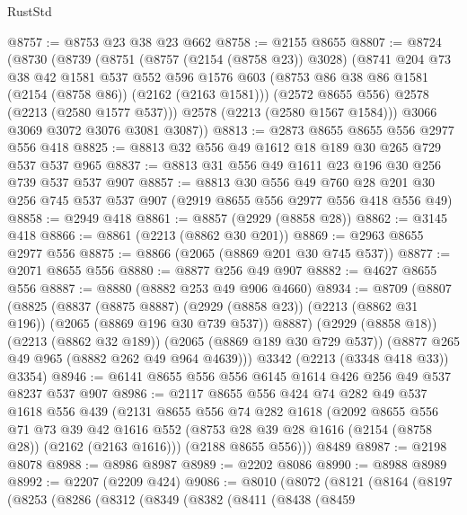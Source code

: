 \begin{lexlean}{RustStd}
\begin{coremodule}
@8757 := @8753 @23 @38 @23 @662
@8758 := @2155 @8655
@8807 := @8724
    (@8730
      (@8739
        (@8751
          (@8757 (@2154 (@8758 @23)) @3028)
          (@8741
            @204
            @73
            @38
            @42
            @1581
            @537
            @552
            @596
            @1576
            @603
            (@8753 @86 @38 @86 @1581 (@2154 (@8758 @86)) (@2162 (@2163 @1581)))
            (@2572 @8655 @556)
            @2578
            (@2213 (@2580 @1577 @537)))
          @2578
          (@2213 (@2580 @1567 @1584)))
        @3066
        @3069
        @3072
        @3076
        @3081
        @3087))
@8813 := @2873 @8655 @8655 @556 @2977 @556 @418
@8825 := @8813 @32 @556 @49 @1612 @18 @189 @30 @265 @729 @537 @537 @965
@8837 := @8813 @31 @556 @49 @1611 @23 @196 @30 @256 @739 @537 @537 @907
@8857 := @8813
    @30
    @556
    @49
    @760
    @28
    @201
    @30
    @256
    @745
    @537
    @537
    @907
    (@2919 @8655 @556 @2977 @556 @418 @556 @49)
@8858 := @2949 @418
@8861 := @8857 (@2929 (@8858 @28))
@8862 := @3145 @418
@8866 := @8861 (@2213 (@8862 @30 @201))
@8869 := @2963 @8655 @2977 @556
@8875 := @8866 (@2065 (@8869 @201 @30 @745 @537))
@8877 := @2071 @8655 @556
@8880 := @8877 @256 @49 @907
@8882 := @4627 @8655 @556
@8887 := @8880 (@8882 @253 @49 @906 @4660)
@8934 := @8709
    (@8807
      (@8825
        (@8837
          (@8875 @8887)
          (@2929 (@8858 @23))
          (@2213 (@8862 @31 @196))
          (@2065 (@8869 @196 @30 @739 @537))
          @8887)
        (@2929 (@8858 @18))
        (@2213 (@8862 @32 @189))
        (@2065 (@8869 @189 @30 @729 @537))
        (@8877 @265 @49 @965 (@8882 @262 @49 @964 @4639)))
      @3342
      (@2213 (@3348 @418 @33))
      @3354)
@8946 := @6141 @8655 @556 @556 @6145 @1614 @426 @256 @49 @537 @8237 @537 @907
@8986 := @2117
    @8655
    @556
    @424
    @74
    @282
    @49
    @537
    @1618
    @556
    @439
    (@2131
      @8655
      @556
      @74
      @282
      @1618
      (@2092
        @8655
        @556
        @71
        @73
        @39
        @42
        @1616
        @552
        (@8753 @28 @39 @28 @1616 (@2154 (@8758 @28)) (@2162 (@2163 @1616)))
        (@2188 @8655 @556)))
    @8489
@8987 := @2198 @8078
@8988 := @8986 @8987
@8989 := @2202 @8086
@8990 := @8988 @8989
@8992 := @2207 (@2209 @424)
@9086 := @8010
    (@8072
      (@8121
        (@8164
          (@8197
            (@8253
              (@8286
                (@8312
                  (@8349
                    (@8382
                      (@8411
                        (@8438
                          (@8459

\end{coremodule}
\end{lexlean}
